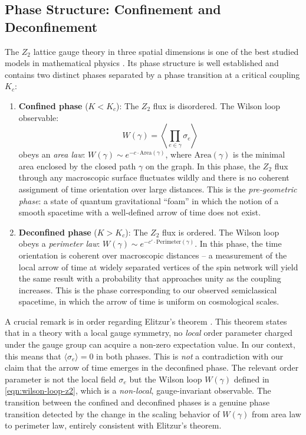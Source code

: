 \documentclass[preprint]{SciPost}
\newcommand{\expect}[1]{\langle #1\rangle}
\theoremstyle{plain} %
\begin{document}
\subsection{Phase Structure: Confinement and Deconfinement}\label{subsec:z2-phases}

The $ Z_2 $ lattice gauge theory in three spatial dimensions is one of the best studied models in mathematical physics \cite{Wegner1971Duality,Kogut1979An-introduction,Fradkin1979Phase}. Its phase structure is well established and contains two distinct phases separated by a phase transition at a critical coupling $ K_c $:

\begin{enumerate}
	\item \textbf{Confined phase} ($ K < K_c $): The $ Z_2 $ flux is disordered. The Wilson loop observable:
	\begin{equation}\label{eqn:wilson-loop-z2}
		W(\gamma) = \left\langle \prod_{e \in \gamma} \sigma_e \right\rangle
	\end{equation}
	obeys an \emph{area law}: $ W(\gamma) \sim e^{-c \cdot \text{Area}(\gamma)} $, where $ \text{Area}(\gamma) $ is the minimal area enclosed by the closed path $ \gamma $ on the graph. In this phase, the $ Z_2 $ flux through any macroscopic surface fluctuates wildly and there is no coherent assignment of time orientation over large distances. This is the \emph{pre-geometric phase}: a state of quantum gravitational ``foam'' in which the notion of a smooth spacetime with a well-defined arrow of time does not exist.

	\item \textbf{Deconfined phase} ($ K > K_c $): The $ Z_2 $ flux is ordered. The Wilson loop obeys a \emph{perimeter law}: $ W(\gamma) \sim e^{-c' \cdot \text{Perimeter}(\gamma)} $. In this phase, the time orientation is coherent over macroscopic distances -- a measurement of the local arrow of time at widely separated vertices of the spin network will yield the same result with a probability that approaches unity as the coupling increases. This is the phase corresponding to our observed semiclassical spacetime, in which the arrow of time is uniform on cosmological scales.
\end{enumerate}

A crucial remark is in order regarding Elitzur's theorem \cite{Elitzur1975Impossibility}. This theorem states that in a theory with a local gauge symmetry, no \emph{local} order parameter charged under the gauge group can acquire a non-zero expectation value. In our context, this means that $ \expect{\sigma_e} = 0 $ in both phases. This is \emph{not} a contradiction with our claim that the arrow of time emerges in the deconfined phase. The relevant order parameter is not the local field $ \sigma_e $ but the Wilson loop $ W(\gamma) $ defined in \eqref{eqn:wilson-loop-z2}, which is a \emph{non-local}, gauge-invariant observable. The transition between the confined and deconfined phases is a genuine phase transition detected by the change in the scaling behavior of $ W(\gamma) $ from area law to perimeter law, entirely consistent with Elitzur's theorem.
\end{document}
